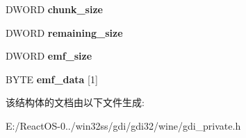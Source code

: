 \begin{DoxyCompactItemize}
D\+W\+O\+RD {\bfseries chunk\+\_\+size}
\item 
\mbox{\label{structemf__in__wmf__comment_aca4dcf6e7b0efabe93606bea3ec30e7f}} 
D\+W\+O\+RD {\bfseries remaining\+\_\+size}
\item 
\mbox{\label{structemf__in__wmf__comment_ac132e55f99d166d44d18ea1c77545257}} 
D\+W\+O\+RD {\bfseries emf\+\_\+size}
\item 
\mbox{\label{structemf__in__wmf__comment_a6b9a95a4ee415a602d34cd478354c157}} 
B\+Y\+TE {\bfseries emf\+\_\+data} \mbox{[}1\mbox{]}
\end{DoxyCompactItemize}


该结构体的文档由以下文件生成\+:\begin{DoxyCompactItemize}
\item 
E\+:/\+React\+O\+S-\/0../win32ss/gdi/gdi32/wine/gdi\+\_\+private.\+h\end{DoxyCompactItemize}
